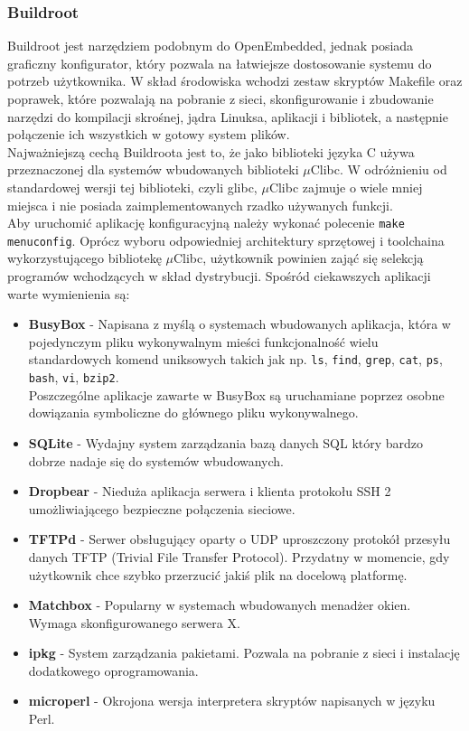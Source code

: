 \documentclass[a4paper,12pt]{book}
\begin{document}
				\subsubsection{Buildroot}
					Buildroot jest narzędziem podobnym do OpenEmbedded, jednak posiada graficzny konfigurator, który pozwala na łatwiejsze dostosowanie systemu do potrzeb użytkownika. W skład środowiska wchodzi zestaw skryptów Makefile oraz poprawek, które pozwalają na pobranie z sieci, skonfigurowanie i zbudowanie narzędzi do kompilacji skrośnej, jądra Linuksa, aplikacji i bibliotek, a następnie połączenie ich wszystkich w gotowy system plików.\\
					Najważniejszą cechą Buildroota jest to, że jako biblioteki języka C używa przeznaczonej dla systemów wbudowanych biblioteki $\mu$Clibc. W odróżnieniu od standardowej wersji tej biblioteki, czyli glibc, $\mu$Clibc zajmuje o wiele mniej miejsca i nie posiada zaimplementowanych rzadko używanych funkcji.\\
					Aby uruchomić aplikację konfiguracyjną należy wykonać polecenie \texttt{make menuconfig}. Oprócz wyboru odpowiedniej architektury sprzętowej i toolchaina wykorzystującego bibliotekę $\mu$Clibc, użytkownik powinien zająć się selekcją programów wchodzących w skład dystrybucji. Spośród ciekawszych aplikacji warte wymienienia są:
					\begin{itemize}
						\item \textbf{BusyBox} - Napisana z myślą o systemach wbudowanych aplikacja, która w pojedynczym pliku wykonywalnym mieści funkcjonalność wielu standardowych komend uniksowych takich jak np. \texttt{ls}, \texttt{find}, \texttt{grep}, \texttt{cat}, \texttt{ps}, \texttt{bash}, \texttt{vi}, \texttt{bzip2}.\\
							Poszczególne aplikacje zawarte w BusyBox są uruchamiane poprzez osobne dowiązania symboliczne do głównego pliku wykonywalnego.
						\item \textbf{SQLite} - Wydajny system zarządzania bazą danych SQL który bardzo dobrze nadaje się do systemów wbudowanych.
						\item \textbf{Dropbear} - Nieduża aplikacja serwera i klienta protokołu SSH 2 umożliwiającego bezpieczne połączenia sieciowe.
						\item \textbf{TFTPd} - Serwer obsługujący oparty o UDP uproszczony protokół przesyłu danych TFTP (Trivial File Transfer Protocol). Przydatny w momencie, gdy użytkownik chce szybko przerzucić jakiś plik na docelową platformę.
						\item \textbf{Matchbox} - Popularny w systemach wbudowanych menadżer okien. Wymaga skonfigurowanego serwera X.
						\item \textbf{ipkg} - System zarządzania pakietami. Pozwala na pobranie z sieci i instalację dodatkowego oprogramowania.
						\item \textbf{microperl} - Okrojona wersja interpretera skryptów napisanych w języku Perl.
					\end{itemize}
\end{document}
